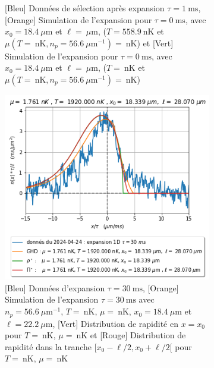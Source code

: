 \documentclass[a3, 10pt,twoside]{article}          %
\theoremstyle{plain}
\theoremstyle{definition}
\theoremstyle{remark}
\theoremstyle{definition} %
\begin{document}
\begin{figure}[H]
\begin{subfigure}[b]{0.32\textwidth}
        \caption{{\color{blue}[Bleu] Données de sélection après expansion $\tau = 1~\text{ms}$}, {\color{orange}[Orange] Simulation de l'expansion pour $\tau = 0~\text{ms}$, avec $x_0 = 18.4~\mu \text{m}$ et $\ell = ~\mu \text{m}$, ($T = 558.9~\text{nK}$ et $\mu(T = ~\text{nK}, n_p = 56.6~\mu \text{m}^{-1}) = ~\text{nK}$)} et {\color{OliveGreen}[Vert] Simulation de l'expansion pour $\tau = 0~\text{ms}$, avec $x_0 = 18.4~\mu \text{m}$ et $\ell = ~\mu \text{m}$, ($T = ~\text{nK}$ et $\mu(T = ~\text{nK}, n_p = 56.6~\mu \text{m}^{-1}) = ~\text{nK}$)}}
        \label{fig:expansion_1_expansion}
    \end{subfigure}
    \hfill
    \begin{subfigure}[b]{0.32\textwidth}
        \centering
        \includegraphics[width=\textwidth]{Figures/simul_expansion_30_expansion}
        \caption{{\color{blue}[Bleu] Données d'expansion $\tau = 30~\text{ms}$}, {\color{orange}[Orange] Simulation de l'expansion $\tau = 30~\text{ms}$ avec $n_p = 56.6~\mu \text{m}^{-1}$, $T = ~\text{nK}$, $\mu = ~\text{nK}$, $x_0 = 18.4~\mu \text{m}$ et $\ell = 22.2~\mu \text{m}$}, {\color{OliveGreen}[Vert] Distribution de rapidité en $x = x_0$ pour $T = ~\text{nK}$, $\mu = ~\text{nK}$} et {\color{red}[Rouge] Distribution de rapidité dans la tranche $[x_0 - \ell/2, x_0 + \ell/2[$ pour $T = ~\text{nK}$, $\mu = ~\text{nK}$}}
        \label{fig:expansion_30_expansion}
    \end{subfigure}
    \caption{}
    \label{}
\end{figure}
\end{document}
